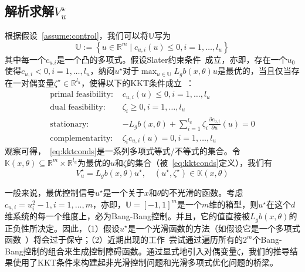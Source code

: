 \subsection{解析求解$V_u^\star$}
根据假设~\ref{assume:control}，我们可以将$\mathbb{U}$写为
\begin{equation}
    \mathbb{U} := \left\{ u \in \mathbb{R}^m \mid c_{u,i}(u) \le 0, i=1, \dots, l_u \right\}
\end{equation}
其中每一个$c_{u.i}$是一个凸的多项式。假设Slater约束条件~\cite{boyd04book-convex}成立，亦即，存在一个$u_0$使得$c_{u,i} < 0, i = 1, \dots, l_u$，纳闷$u^\star$对于$\max_{u \in \mathbb{U}} L_gb(x,\theta)u$是最优的，当且仅当存在一对偶变量$\zeta^\star \in \mathbb{R}^{l_u}$，使得以下的KKT条件成立~\cite{boyd04book-convex}：
\begin{subequations}\label{eq:kktconds}
    \begin{eqnarray}
        \text{primal feasibility: }& c_{u,i}(u) \le 0, i = 1, \dots, l_u \label{eq:kktprimal} \\
        \text{dual feasibility: }& \zeta_i \ge 0, i = 1, \dots, l_u \label{eq:kktdual} \\
        \text{stationary: }& -L_gb(x, \theta) + \sum_{i=1}^{l_u}\zeta_i \frac{\partial c_{u,i}}{\partial u}(u) = 0 \label{eq:kktstationary} \\
        \text{complementarity: }& \zeta_i c_{u,i}(u) = 0, i = 1, \dots, l_u \label{eq:kktcomp}
    \end{eqnarray}
\end{subequations}
观察可得，~\eqref{eq:kktconds}是一系列多项式等式/不等式的集合。令$\mathbb{K}(x, \theta) \subseteq \mathbb{R}^m \times \mathbb{R}^{l_u}$为最优的$u$和$\zeta$的集合（被~\eqref{eq:kktconds}定义），我们有
\begin{equation}\label{eq:Vustar}
    V_u^\star = L_gb(x, \theta) u^\star, \quad (u^\star, \zeta^\star) \in \mathbb{K}(x, \theta)
\end{equation}

\begin{remark}
    一般来说，最优控制信号$u^\star$是一个关于$x$和$\theta$的不光滑的函数。考虑$c_{u,i} = u_i^2 - 1, i = 1, \dots, m$，亦即，$\mathbb{U} = [-1, 1]^m$是一个$m$维的箱型，则$u^\star$在这个$d$维系统的每一个维度上，必为Bang-Bang控制。并且，它的值直接被$L_gb(x, \theta)$的正负性所决定。因此，（1）假设$u^\star$是一个光滑函数的方法（如假设它是一个多项式函数~\cite{jarvis03cdc-some}）将会过于保守；（2）近期出现的工作~\cite{zhao22arxiv-cbfsos}尝试通过遍历所有的$2^m$个Bang-Bang控制的组合来生成控制障碍函数。通过显式地引入对偶变量$\zeta$，我们的推导结果使用了KKT条件来构建起非光滑控制问题和光滑多项式优化问题的桥梁。
\end{remark}

